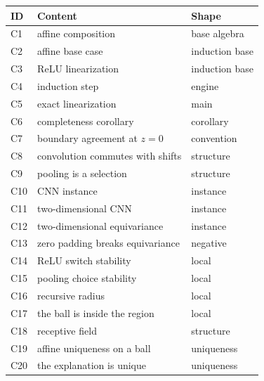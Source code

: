 \documentclass[11pt]{article}
\begin{document}
\begin{center}
\begin{tabular}{@{}lll@{}}
\toprule
ID & Content & Shape \\
\midrule
C1 & affine composition & base algebra \\
C2 & affine base case & induction base \\
C3 & ReLU linearization & induction base \\
C4 & induction step & engine \\
C5 & exact linearization & main \\
C6 & completeness corollary & corollary \\
C7 & boundary agreement at $z=0$ & convention \\
C8 & convolution commutes with shifts & structure \\
C9 & pooling is a selection & structure \\
C10 & CNN instance & instance \\
C11 & two-dimensional CNN & instance \\
C12 & two-dimensional equivariance & instance \\
C13 & zero padding breaks equivariance & negative \\
C14 & ReLU switch stability & local \\
C15 & pooling choice stability & local \\
C16 & recursive radius & local \\
C17 & the ball is inside the region & local \\
C18 & receptive field & structure \\
C19 & affine uniqueness on a ball & uniqueness \\
C20 & the explanation is unique & uniqueness \\
\bottomrule
\end{tabular}
\end{center}
\end{document}

